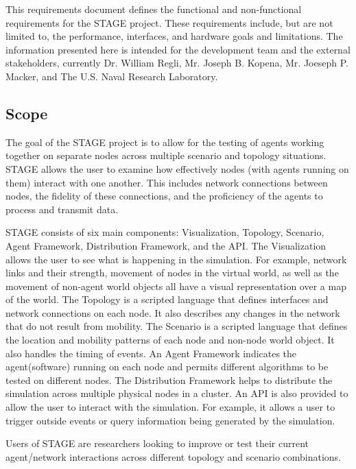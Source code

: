 \documentclass[titlepage]{article}
\begin{document}
This requirements document defines the functional and non-functional requirements for the STAGE project.  These requirements include, but are not limited to, the performance, interfaces, and hardware goals and limitations.  The information presented here is intended for the development team and the external stakeholders, currently Dr. William Regli, Mr. Joseph B. Kopena, Mr. Joeseph P. Macker, and The U.S. Naval Research Laboratory.


\subsection{Scope%
  \label{scope}%
}

The goal of the STAGE project is to allow for the testing of agents working together on separate nodes across multiple scenario and topology situations.  STAGE allows the user to examine how effectively nodes (with agents running on them) interact with one another.  This includes network connections between nodes, the fidelity of these connections, and the proficiency of the agents to process and transmit data.

STAGE consists of six main components: Visualization, Topology, Scenario, Agent Framework, Distribution Framework, and the API.  The Visualization allows the user to see what is happening in the simulation.  For example, network links and their strength, movement of nodes in the virtual world, as well as the movement of non-agent world objects all have a visual representation over a map of the world.  The Topology is a scripted language that defines interfaces and network connections on each node.  It also describes any changes in the network that do not result from mobility.  The Scenario is a scripted language that defines the location and mobility patterns of each node and non-node world object. It also handles the timing of events. An Agent Framework indicates the agent(software) running on each node and permits different algorithms to be tested on different nodes.  The Distribution Framework helps to distribute the simulation across multiple physical nodes in a cluster.  An API is also provided to allow the user to interact with the simulation.  For example, it allows a user to trigger outside events or query information being generated by the simulation. 

Users of STAGE are researchers looking to improve or test their current agent/network interactions across different topology and scenario combinations.  
\end{document}
